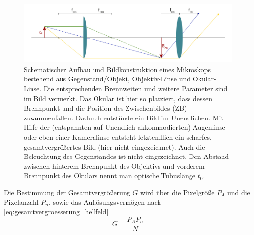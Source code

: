 \documentclass[ngerman]{scrartcl}
\begin{document}
\begin{figure}[H]
    \centering
    \begin{samepage}
        \includegraphics[width=\linewidth]{fig/Hellfeld.png}
        \caption[Aufbau eines Hellfeld-Transmissionsmikroskops]{Schematischer Aufbau und Bildkonstruktion eines Mikroskops bestehend aus Gegenstand/Objekt, Objektiv-Linse und Okular-Linse. Die entsprechenden Brennweiten und weitere Parameter sind im Bild vermerkt. Das Okular ist hier so platziert, dass dessen Brennpunkt und die Position des Zwischenbildes (ZB) zusammenfallen. Dadurch entstünde ein Bild im Unendlichen. Mit Hilfe der (entspannten auf Unendlich akkommodierten) Augenlinse oder eben einer Kameralinse entsteht letztendlich ein scharfes, gesamtvergrößertes Bild (hier nicht eingezeichnet). Auch die Beleuchtung des Gegenstandes ist nicht eingezeichnet. Den Abstand zwischen hinterem Brennpunkt des Objektivs und vorderem Brennpunkt des Okulars nennt man optische Tubuslänge $t_0$.}
        \label{fig:hellfeld_skizze}
    \end{samepage}
\end{figure}

Die Bestimmung der Gesamtvergrößerung $G$ wird über die Pixelgröße $P_A$ und die Pixelanzahl $P_n$, sowie das Auflösungsvermögen nach \autoref{eq:gesamtvergroesserung_hellfeld}
\begin{equation}
    \label{eq:gesamtvergroesserung_hellfeld}
    G = \frac{P_A P_n}{N}
\end{equation}
\end{document}
